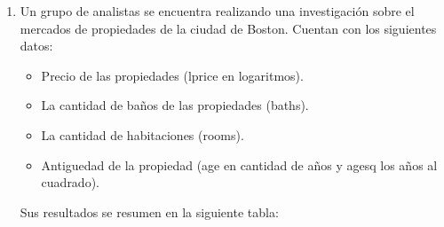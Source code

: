\documentclass[10pt,a4paper]{article}
\begin{document}
\begin{enumerate}
\begin{enumerate}
    \item {(5 puntos)} En términos de los parámetros del modelo, establezca la hipótesis nula de que, controlando por \textit{Precipitaciones} y \textit{Temperatura}, la \textit{Velocidad} no tiene efecto en la \textit{Fuerza del Tornado} y luego comente la aseveración de lo anterior.
     \item {(5 puntos)} Interprete los coeficientes en la regresión (2). En particular \textit{Velocidad del Viento}, ¿es mayor o menor que el coeficiente correspondiente en la regresión simple (1)? Explique.
  \item {(5 puntos)} Testee la significancia global del modelo al 1\% y explique.\footnote{Hint: considere que el valor crítico de F al 1\% con grados de libertad (3,178) es aproximadamente 3.87}
   \item {(5 puntos)} Para explicar el Fuerza del Tornado, ¿es mejor el modelo restringido o el no restringido? Argumente.
        \end{enumerate}

        \item Un grupo de analistas se encuentra realizando una investigación sobre  el mercados de propiedades de la ciudad de Boston.  
Cuentan con los siguientes datos:

\begin{itemize}
    \item Precio de las propiedades (lprice en logaritmos).
    \item La cantidad de baños de las propiedades (baths). 
    \item La cantidad de habitaciones (rooms).
        \item Antiguedad de la propiedad (age en cantidad de años y agesq los años al cuadrado). 
\end{itemize}

Sus resultados se resumen en la siguiente  tabla:


\end{enumerate}
\end{document}
